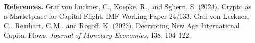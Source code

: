 \documentclass[11pt]{article}
\begin{document}
\vspace{-4pt}
{\footnotesize\textbf{References.} Graf von Luckner, C., Koepke, R., and Sgherri, S. (2024). Crypto as a Marketplace for Capital Flight. IMF Working Paper 24/133. \quad Graf von Luckner, C., Reinhart, C.\,M., and Rogoff, K. (2023). Decrypting New Age International Capital Flows. \emph{Journal of Monetary Economics}, 138, 104--122.\par}
\end{document}

